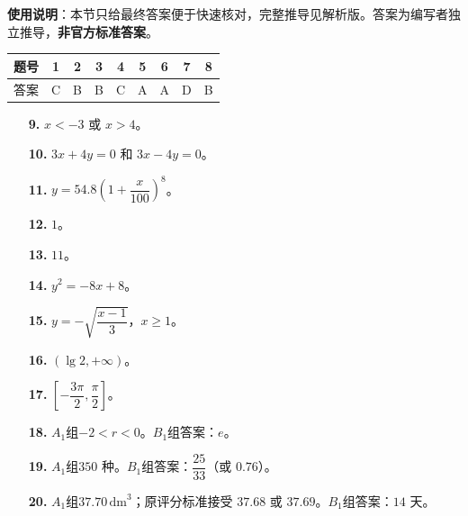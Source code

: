 
\begin{gknotice}
\textbf{使用说明}：本节只给最终答案便于快速核对，完整推导见解析版。答案为编写者独立推导，\textbf{非官方标准答案}。
\end{gknotice}

\begin{center}\begin{tabular}{ccccccccc}
\toprule
题号 & 1 & 2 & 3 & 4 & 5 & 6 & 7 & 8 \\
\midrule
答案 & C & B & B & C & A & A & D & B \\
\bottomrule
\end{tabular}\end{center}

\begin{itemize}[leftmargin=2.6em]
  \item[\textbf{9.}] $x<-3$ 或 $x>4$。
  \item[\textbf{10.}] $3x+4y=0$ 和 $3x-4y=0$。
  \item[\textbf{11.}] $y=54.8\left(1+\dfrac{x}{100}\right)^8$。
  \item[\textbf{12.}] $1$。
  \item[\textbf{13.}] $11$。
  \item[\textbf{14.}] $y^2=-8x+8$。
  \item[\textbf{15.}] $y=-\sqrt{\dfrac{x-1}{3}}$，$x\ge1$。
  \item[\textbf{16.}] $(\lg2,+\infty)$。
  \item[\textbf{17.}] $\left[-\dfrac{3\pi}{2},\dfrac\pi2\right]$。
  \item[\textbf{18.}] $A_1$组$-2<r<0$。$B_1$组答案：$e$。
  \item[\textbf{19.}] $A_1$组$350$ 种。$B_1$组答案：$\dfrac{25}{33}$（或 $0.76$）。
  \item[\textbf{20.}] $A_1$组$37.70\,\mathrm{dm}^3$；原评分标准接受 $37.68$ 或 $37.69$。$B_1$组答案：$14$ 天。
\end{itemize}

